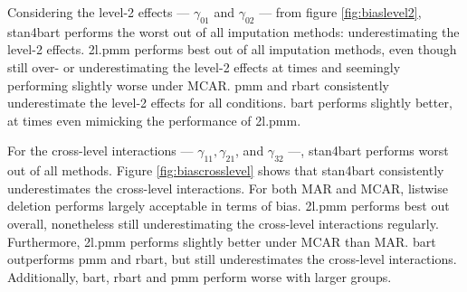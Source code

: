 \documentclass[3p,12pt,a4paper]{elsarticle}
\begin{document}
Considering the level-2 effects --- $\gamma_{01}$ and $\gamma_{02}$ --- from figure \ref{fig:biaslevel2}, stan4bart performs the worst out of all imputation methods: underestimating the level-2 effects. 2l.pmm performs best out of all imputation methods, even though still over- or underestimating the level-2 effects at times and seemingly performing slightly worse under MCAR. pmm and rbart consistently underestimate the level-2 effects for all conditions. bart performs slightly better, at times even mimicking the performance of 2l.pmm. 

For the cross-level interactions --- $\gamma_{11}, \gamma_{21}$, and $\gamma_{32}$ ---, stan4bart performs worst out of all methods. Figure \ref{fig:biascrosslevel} shows that stan4bart consistently underestimates the cross-level interactions. For both MAR and MCAR, listwise deletion performs largely acceptable in terms of bias. 2l.pmm performs best out overall, nonetheless still underestimating the cross-level interactions regularly. Furthermore, 2l.pmm performs slightly better under MCAR than MAR. bart outperforms pmm and rbart, but still underestimates the cross-level interactions. Additionally, bart, rbart and pmm perform worse with larger groups. 
\end{document}
